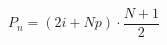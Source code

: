 \documentclass[preview]{standalone}
\begin{document}
\begin{align*}
P_n = (2i+Np)\cdot\dfrac{N+1}2
\end{align*}
\end{document}
